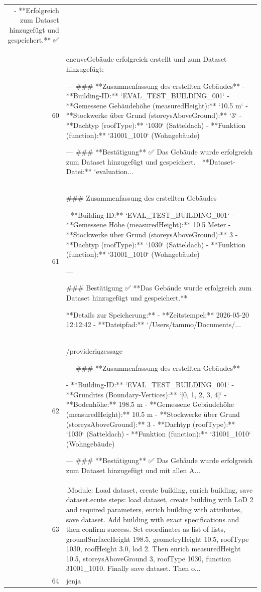 \documentclass[a4paper,11pt]{article}
\begin{document}
\begin{table}[ht]
\begin{tabular}{r p{12cm}}
- **Erfolgreich zum Dataset hinzugefügt und gespeichert.** ✅ \\
60 & eneuveGebäude erfolgreich erstellt und zum Dataset hinzugefügt:

---
\#\#\# **Zusammenfassung des erstellten Gebäudes**
- **Building-ID:** `EVAL\_TEST\_BUILDING\_001`
- **Gemessene Gebäudehöhe (measuredHeight):** `10.5 m`
- **Stockwerke über Grund (storeysAboveGround):** `3`
- **Dachtyp (roofType):** `1030` (Satteldach)
- **Funktion (function):** `31001\_1010` (Wohngebäude)

---
\#\#\# **Bestätigung**
✅ Das Gebäude wurde erfolgreich zum Dataset hinzugefügt und gespeichert.
📁 **Dataset-Datei:** `evaluation... \\
61 & \#\#\# Zusammenfassung des erstellten Gebäudes

- **Building-ID:** `EVAL\_TEST\_BUILDING\_001`
- **Gemessene Höhe (measuredHeight):** 10.5 Meter
- **Stockwerke über Grund (storeysAboveGround):** 3
- **Dachtyp (roofType):** `1030` (Satteldach)
- **Funktion (function):** `31001\_1010` (Wohngebäude)

---

\#\#\# Bestätigung
✅ **Das Gebäude wurde erfolgreich zum Dataset hinzugefügt und gespeichert.**

**Details zur Speicherung:**
- **Zeitstempel:** 2026-05-20 12:12:42
- **Dateipfad:** `/Users/tammo/Documents/... \\
62 & /provideriązessage

---
\#\#\# **Zusammenfassung des erstellten Gebäudes**

- **Building-ID:** `EVAL\_TEST\_BUILDING\_001`
- **Grundriss (Boundary-Vertices):**
  `[0, 1, 2, 3, 4]`
- **Bodenhöhe:** 198.5 m
- **Gemessene Gebäudehöhe (measuredHeight):** 10.5 m
- **Stockwerke über Grund (storeysAboveGround):** 3
- **Dachtyp (roofType):** `1030` (Satteldach)
- **Funktion (function):** `31001\_1010` (Wohngebäude)

---
\#\#\# **Bestätigung**
✅ Das Gebäude wurde erfolgreich zum Dataset hinzugefügt und mit allen A... \\
63 & .Module: Load dataset, create building, enrich building, save dataset.ecute steps: load dataset, create building with LoD 2 and required parameters, enrich building with attributes, save dataset. Add building with exact specifications and then confirm success. Set coordinates as list of lists, groundSurfaceHeight 198.5, geometryHeight 10.5, roofType 1030, roofHeight 3.0, lod 2. Then enrich measuredHeight 10.5, storeysAboveGround 3, roofType 1030, function 31001\_1010. Finally save dataset. Then o... \\
64 & jenja


\end{tabular}
\end{table}
\end{document}
